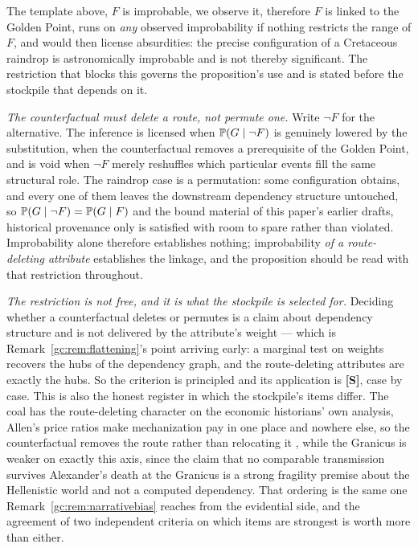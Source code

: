 \begin{remark}\label{gc:rem:flukescope}
The template above, $F$ is improbable, we observe it, therefore $F$
is linked to the Golden Point, runs on \emph{any} observed
improbability if nothing restricts the range of $F$, and would then
license absurdities: the precise configuration of a Cretaceous
raindrop is astronomically improbable and is not thereby significant.
The restriction that blocks this governs the proposition's use and is
stated before the stockpile that depends on it.

\emph{The counterfactual must delete a route, not permute one.} Write
$\neg F$ for the alternative. The inference is licensed when
$\mathbb{P}(G\mid\neg F)$ is genuinely lowered by the substitution, when
the counterfactual removes a prerequisite of the Golden Point, and
is void when $\neg F$ merely reshuffles which particular events fill
the same structural role. The raindrop case is a permutation: some
configuration obtains, and every one of them leaves the downstream
dependency structure untouched, so $\mathbb{P}(G\mid\neg F)=\mathbb{P}(G\mid F)$ and
the bound material of this paper's earlier drafts, historical provenance only is satisfied with room to spare
rather than violated. Improbability alone therefore establishes
nothing; improbability \emph{of a route-deleting attribute}
establishes the linkage, and the proposition should be read with that
restriction throughout.

\emph{The restriction is not free, and it is what the stockpile is
selected for.} Deciding whether a counterfactual deletes or permutes
is a claim about dependency structure and is not delivered by the
attribute's weight --- which is
Remark~\ref{gc:rem:flattening}'s point arriving early: a marginal test
on weights recovers the hubs of the dependency graph, and the
route-deleting attributes are exactly the hubs. So the criterion is
principled and its application is \textbf{[S]}, case by case. This is
also the honest register in which the stockpile's items differ. The
coal has the route-deleting character on the economic historians' own
analysis, Allen's price ratios make mechanization pay in one place
and nowhere else, so the counterfactual removes the route rather than
relocating it \cite{Allen09}, while the Granicus is weaker on
exactly this axis, since the claim that no comparable transmission
survives Alexander's death at the Granicus is a strong fragility
premise about the Hellenistic world and not a computed dependency.
That ordering is the same one Remark~\ref{gc:rem:narrativebias} reaches
from the evidential side, and the agreement of two independent
criteria on which items are strongest is worth more than either.
\end{remark}

